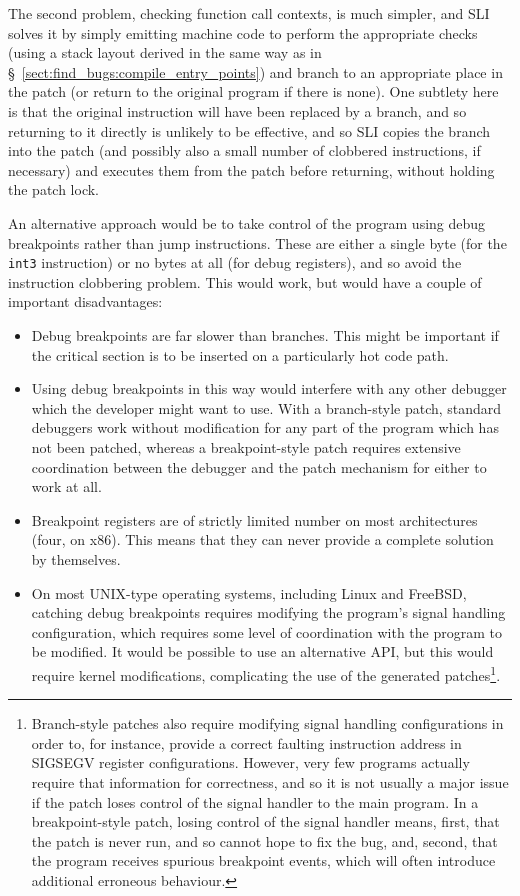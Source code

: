 The second problem, checking function call contexts, is much simpler,
and SLI solves it by simply emitting machine code to perform the
appropriate checks (using a stack layout derived in the same way as in
\S~\ref{sect:find_bugs:compile_entry_points}) and branch to an
appropriate place in the patch (or return to the original program if
there is none).  One subtlety here is that the original instruction
will have been replaced by a branch, and so returning to it directly
is unlikely to be effective, and so SLI copies the branch into the
patch (and possibly also a small number of clobbered instructions, if
necessary) and executes them from the patch before returning, without
holding the patch lock.

An alternative approach would be to take control of the program using
debug breakpoints rather than jump instructions.  These are either a
single byte (for the \verb|int3| instruction) or no bytes at all (for
debug registers), and so avoid the instruction clobbering problem.
This would work, but would have a couple of important disadvantages:

\begin{itemize}
\item
  Debug breakpoints are far slower than branches.  This might be
  important if the critical section is to be inserted on a
  particularly hot code path.
\item
  Using debug breakpoints in this way would interfere with any other
  debugger which the developer might want to use.  With a branch-style
  patch, standard debuggers work without modification for any part of
  the program which has not been patched, whereas a breakpoint-style
  patch requires extensive coordination between the debugger and the
  patch mechanism for either to work at all.
\item
  Breakpoint registers are of strictly limited number on most
  architectures (four, on x86).  This means that they can never
  provide a complete solution by themselves.
\item
  On most UNIX-type operating systems, including Linux and FreeBSD,
  catching debug breakpoints requires modifying the program's signal
  handling configuration, which requires some level of coordination
  with the program to be modified.  It would be possible to use an
  alternative API, but this would require kernel modifications,
  complicating the use of the generated patches\footnote{Branch-style
    patches also require modifying signal handling configurations in
    order to, for instance, provide a correct faulting instruction
    address in SIGSEGV register configurations.  However, very few
    programs actually require that information for correctness, and so
    it is not usually a major issue if the patch loses control of the
    signal handler to the main program.  In a breakpoint-style patch,
    losing control of the signal handler means, first, that the patch
    is never run, and so cannot hope to fix the bug, and, second, that
    the program receives spurious breakpoint events, which will often
    introduce additional erroneous behaviour.}.
\end{itemize}

